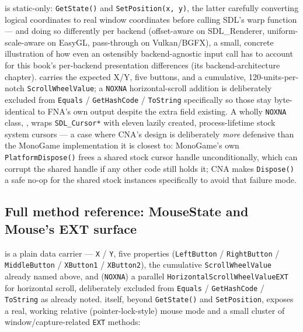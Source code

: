  is static-only: \texttt{GetState()} and \texttt{SetPosition(x, y)}, the
latter carefully converting logical coordinates to real window coordinates before calling
SDL's warp function --- and doing so differently per backend (offset-aware on SDL\_Renderer,
uniform-scale-aware on EasyGL, pass-through on Vulkan/BGFX), a small, concrete illustration of
how even an ostensibly backend-agnostic input call has to account for
this book's per-backend presentation differences (its backend-architecture chapter).
 carries the expected X/Y, five buttons, and a cumulative,
120-units-per-notch \texttt{ScrollWheelValue}; a \texttt{NOXNA} horizontal-scroll addition is
deliberately excluded from \texttt{Equals} / \texttt{GetHashCode} / \texttt{ToString} specifically
so those stay byte-identical to FNA's own output despite the extra field existing. A wholly
\texttt{NOXNA} class, , wraps \texttt{SDL\_Cursor*} with eleven lazily
created, process-lifetime stock system cursors --- a case where CNA's design is deliberately
\emph{more} defensive than the MonoGame implementation it is closest to: MonoGame's own
\texttt{PlatformDispose()} frees a shared stock cursor handle unconditionally, which can
corrupt the shared handle if any other code still holds it; CNA makes \texttt{Dispose()} a
safe no-op for the shared stock instances specifically to avoid that failure mode.

\subsection{Full method reference: MouseState and Mouse's EXT surface}

 is a plain data carrier --- \texttt{X} / \texttt{Y}, five
 properties (\texttt{LeftButton} / \texttt{RightButton} /
\texttt{MiddleButton} / \texttt{XButton1} / \texttt{XButton2}), the cumulative
\texttt{ScrollWheelValue} already named above, and (\texttt{NOXNA}) a parallel
\texttt{HorizontalScrollWheelValueEXT} for horizontal scroll, deliberately excluded from
\texttt{Equals} / \texttt{GetHashCode} / \texttt{ToString} as already noted. 
itself, beyond \texttt{GetState()} and \texttt{SetPosition}, exposes a real, working relative
(pointer-lock-style) mouse mode and a small cluster of window/capture-related \texttt{EXT}
methods:

